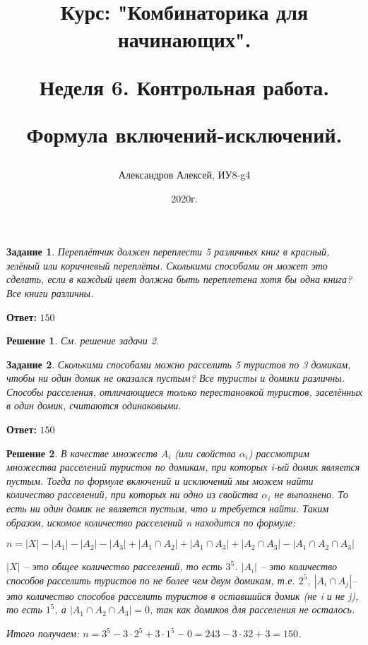 \documentclass[a4paper,oneside]{memoir}
\title{Курс: "Комбинаторика для начинающих".
	
Неделя 6. Контрольная работа.
	 
Формула включений-исключений.}
\author{Александров Алексей, ИУ8-g4}
\date{2020г.}
\newtheorem{task}{Задание}
\newtheorem{solution}{Решение}
\begin{document}
	
\maketitle

\begin{task}
	Переплётчик должен переплести 5 различных книг в красный, зелёный или коричневый переплёты. Сколькими способами он может это сделать, если в каждый цвет должна быть переплетена хотя бы одна книга? Все книги различны.
\end{task}

\textbf{Ответ:} $ 150 $

\begin{solution}
См. решение задачи 2.
\end{solution}

\hrulefill

\begin{task}
Сколькими способами можно расселить 5 туристов по 3 домикам, чтобы ни один домик не оказался пустым? Все туристы и домики различны. Способы расселения, отличающиеся только перестановкой туристов, заселённых в один домик, считаются одинаковыми.
\end{task}

\textbf{Ответ:} $ 150 $

\begin{solution}
В качестве множеств $ A_i $ (или свойства $ \alpha_i $) рассмотрим множества расселений туристов по домикам, при которых i-ый домик является пустым. Тогда по формуле включений и исключений мы можем найти количество расселений, при которых ни одно из свойства $ \alpha_i $ не выполнено. То есть ни один домик не является пустым, что и требуется найти. Таким образом, искомое количество расселений n находится по формуле:

$ n = |X| - |A_1| - |A_2| - |A_3| + |A_1 \cap A_2| + |A_1 \cap A_3| + |A_2 \cap A_3| - |A_1 \cap A_2 \cap A_3| $


$ |X| $ -- это общее количество расселений, то есть $ 3^5 $. $ |A_i| $ -- это количество способов расселить туристов по не более чем двум домикам, т.е. $ 2^5 $, $ |A_i \cap A_j| $-- это количество способов расселить туристов в оставшийся домик (не i и не j), то есть $ 1^5 $, а $ |A_1 \cap A_2 \cap A_3| = 0 $, так как домиков для расселения не осталось.


Итого получаем: $ n = 3^5 - 3\cdot 2^5 + 3 \cdot 1^5 - 0 = 243 - 3\cdot 32 + 3 = 150 $.
\end{solution}

\hrulefill
\end{document}
